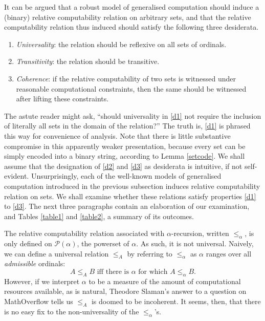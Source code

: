 \documentclass[12pt, twoside]{memoir}
\numberwithin{equation}{section}
\theoremstyle{definition}
\theoremstyle{remark}
\theoremstyle{definition}
\theoremstyle{definition}
\theoremstyle{definition}
\theoremstyle{remark}
\begin{document}
It can be argued that a robust model of generalised computation should induce a (binary) relative computability relation on arbitrary sets, and that the relative computability relation thus induced should satisfy the following three desiderata.
\begin{enumerate}[leftmargin=40pt, label=(D\arabic*)]
    \item\label{d1} \textit{Universality}: the relation should be reflexive on all sets of ordinals.
    \item\label{d2} \textit{Transitivity}: the relation should be transitive.
    \item\label{d3} \textit{Coherence}: if the relative computability of two sets is witnessed under reasonable computational constraints, then the same should be witnessed after lifting these constraints.
\end{enumerate}
The astute reader might ask, ``should universality in \ref{d1} not require the inclusion of literally all sets in the domain of the relation?'' The truth is, \ref{d1} is phrased this way for convenience of analysis. Note that there is little substantive compromise in this apparently weaker presentation, because every set can be simply encoded into a binary string, according to Lemma \ref{setcode}. We shall assume that the designation of \ref{d2} and \ref{d3} as desiderata is intuitive, if not self-evident. Unsurprisingly, each of the well-known models of generalised computation introduced in the previous subsection induces relative computability relation on sets. We shall examine whether these relations satisfy properties \ref{d1} to \ref{d3}. The next three paragraphs contain an elaboration of our examination, and Tables \ref{table1} and \ref{table2}, a summary of its outcomes.

The relative computability relation associated with $\alpha$-recursion, written $\leq_{\alpha}$, is only defined on $\mathcal{P}(\alpha)$, the powerset of $\alpha$. As such, it is not universal. Naively, we can define a universal relation $\leq_A$ by referring to $\leq_{\alpha}$ as $\alpha$ ranges over all \textit{admissible} ordinals: $$A \leq_A B \text{ iff there is } \alpha \text{ for which } A \leq_{\alpha} B \text{.}$$ However, if we interpret $\alpha$ to be a measure of the amount of computational resources available, as is natural, Theodore Slaman's answer to a question on MathOverflow \cite{slaman} tells us $\leq_A$ is doomed to be incoherent. It seems, then, that there is no easy fix to the non-universality of the $\leq_{\alpha}$'s.
\end{document}
